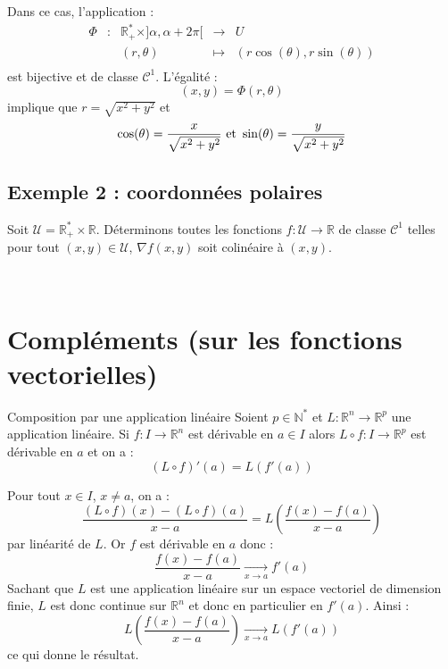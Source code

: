 \documentclass[french,11pt,twoside]{VcCours}
\begin{document}
\vspace*{3cm}

Dans ce cas, l'application :
$$ \begin{array}{cccll}
\Phi & : & \mathbb{R}_+^{*} \times ]\alpha, \alpha + 2 \pi[ & \rightarrow & U \\
& & (r, \theta) & \mapsto & (r \cos(\theta), r \sin(\theta)) \\
\end{array}$$
est bijective et de classe $\mathcal{C}^1$. L'égalité :
$$ (x,y) = \Phi(r ,\theta)$$ implique que $r= \sqrt{x^2+y^2}$ et 
$$ \cos(\theta) = \dfrac{x}{\sqrt{x^2+y^2}} \hbox{ et } \sin(\theta) = \dfrac{y}{\sqrt{x^2+y^2}} $$

\subsection{Exemple 2 : coordonnées polaires}
Soit $\mathcal{U} = \mathbb{R}_+^{*} \times \mathbb{R}$. Déterminons toutes les fonctions $f : \mathcal{U} \rightarrow \mathbb{R}$ de classe $\mathcal{C}^1$ telles pour tout $(x,y) \in \mathcal{U}$, $\nabla f (x,y)$ soit colinéaire à $(x,y)$.
\newpage

$\phantom{test}$

\vspace*{7cm}

\section{Compléments (sur les fonctions vectorielles)}

\begin{Proposition}{Composition par une application linéaire}
Soient $p \in \mathbb{N}^*$ et $L : \mathbb{R}^n \rightarrow \mathbb{R}^p$ une application linéaire. Si $f : I \rightarrow \mathbb{R}^n$ est dérivable en $a \in I$ alors $L \circ f : I \rightarrow \mathbb{R}^p$ est dérivable en $a$ et on a :
$$ (L \circ f)'(a) = L (f'(a))$$
\end{Proposition}

\begin{Demonstration}{} Pour tout $x \in I$, $x \neq a$, on a :
$$ \dfrac{(L \circ f)(x) - (L \circ f)(a) }{x-a} = L \left( \frac{f(x)-f(a)}{x-a} \right)$$
par linéarité de $L$. Or $f$ est dérivable en $a$ donc :
$$ \frac{f(x)-f(a)}{x-a} \underset{x \rightarrow a}{\longrightarrow} f'(a)$$
Sachant que $L$ est une application linéaire sur un espace vectoriel de dimension finie, $L$ est donc continue sur $\mathbb{R}^n$ et donc en particulier en $f'(a)$. Ainsi :
$$ L \left( \frac{f(x)-f(a)}{x-a} \right) \underset{x \rightarrow a}{\longrightarrow} L(f'(a))$$
ce qui donne le résultat.
\end{Demonstration}
\end{document}
